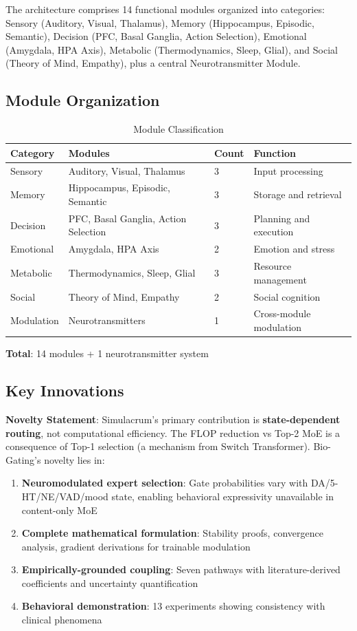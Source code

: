 \documentclass[preprint,12pt]{elsarticle}
\begin{document}
The architecture comprises 14 functional modules organized into categories: Sensory (Auditory, Visual, Thalamus), Memory (Hippocampus, Episodic, Semantic), Decision (PFC, Basal Ganglia, Action Selection), Emotional (Amygdala, HPA Axis), Metabolic (Thermodynamics, Sleep, Glial), and Social (Theory of Mind, Empathy), plus a central Neurotransmitter Module.

\subsection{Module Organization}

\begin{table}[htbp]
\centering
\caption{Module Classification}
\label{tab:modules}
\begin{tabular}{llll}
\toprule
\textbf{Category} & \textbf{Modules} & \textbf{Count} & \textbf{Function} \\
\midrule
Sensory & Auditory, Visual, Thalamus & 3 & Input processing \\
Memory & Hippocampus, Episodic, Semantic & 3 & Storage and retrieval \\
Decision & PFC, Basal Ganglia, Action Selection & 3 & Planning and execution \\
Emotional & Amygdala, HPA Axis & 2 & Emotion and stress \\
Metabolic & Thermodynamics, Sleep, Glial & 3 & Resource management \\
Social & Theory of Mind, Empathy & 2 & Social cognition \\
Modulation & Neurotransmitters & 1 & Cross-module modulation \\
\bottomrule
\end{tabular}
\end{table}

\textbf{Total}: 14 modules + 1 neurotransmitter system

\subsection{Key Innovations}

\textbf{Novelty Statement}: Simulacrum's primary contribution is \textbf{state-dependent routing}, not computational efficiency. The FLOP reduction vs Top-2 MoE is a consequence of Top-1 selection (a mechanism from Switch Transformer). Bio-Gating's novelty lies in:

\begin{enumerate}
\item \textbf{Neuromodulated expert selection}: Gate probabilities vary with DA/5-HT/NE/VAD/mood state, enabling behavioral expressivity unavailable in content-only MoE
\item \textbf{Complete mathematical formulation}: Stability proofs, convergence analysis, gradient derivations for trainable modulation
\item \textbf{Empirically-grounded coupling}: Seven pathways with literature-derived coefficients and uncertainty quantification
\item \textbf{Behavioral demonstration}: 13 experiments showing consistency with clinical phenomena
\end{enumerate}
\end{document}
